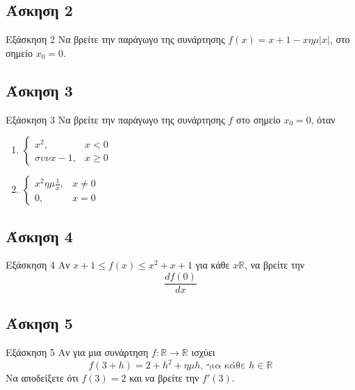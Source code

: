 \documentclass[greek]{beamer}
\begin{document}
\subsection{Άσκηση 2}
\begin{frame}[label=Άσκηση2]{Εξάσκηση 2}
 Να βρείτε την παράγωγο της συνάρτησης $f(x)=x+1-xημ|x|$, στο σημείο $x_0=0$.

\end{frame}

\subsection{Άσκηση 3}
\begin{frame}[label=Άσκηση3]{Εξάσκηση 3}
 Να βρείτε την παράγωγο της συνάρτησης $f$ στο σημείο $x_0=0$, όταν
 \begin{enumerate}
  \item<1-> $\begin{cases}
     x^2,    & x<0    \\
     συνx-1, & x\ge 0
    \end{cases}$
  \item<2-> $\begin{cases}
     x^2ημ\frac{1}{x}, & x\ne 0 \\
     0,                & x= 0
    \end{cases}$
 \end{enumerate}

\end{frame}

\subsection{Άσκηση 4}
\begin{frame}[label=Άσκηση4]{Εξάσκηση 4}
 Αν $x+1\le f(x) \le x^2+x+1$ για κάθε $x\mathbb{R}$, να βρείτε την
 $$\frac{df(0)}{dx}$$

\end{frame}

\subsection{Άσκηση 5}
\begin{frame}[label=Άσκηση5]{Εξάσκηση 5}
 Αν για μια συνάρτηση $f:\mathbb{R}\to\mathbb{R}$ ισχύει
 $$f(3+h)=2+h^2+ημh \text{, για κάθε } h\in\mathbb{R}$$
 Να αποδείξετε ότι $f(3)=2$ και να βρείτε την $f'(3)$.

\end{frame}
\end{document}
